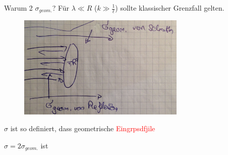 	Warum 2 $\sigma_{geom.}$? Für $\lambda \ll R$ ($k \gg \frac{1}{\ell}$) sollte klassischer Grenzfall gelten.
	\begin{figure} [h]
		\begin{center}
			\includegraphics[width=8cm]{Annaherung_harte_Kugel2}
		\end{center}
	\end{figure}	
	
	$\sigma$ ist so definiert, dass geometrische \textcolor{red}{Eingrpsdfjile} 
	
	$\sigma = 2 \sigma_{geom.}$ ist